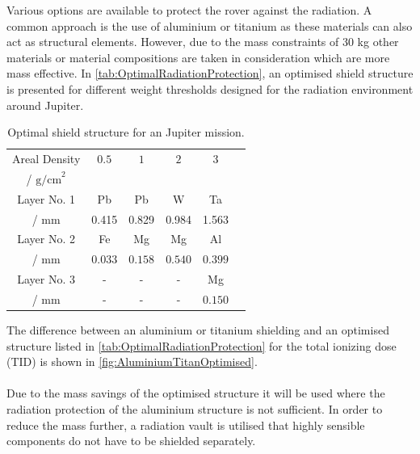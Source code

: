 Various options are available to protect the rover against the radiation. A common approach is the use of aluminium or titanium as these materials can also act as structural elements. However, due to the mass constraints of 30 kg other materials or material compositions are taken in consideration which are more mass effective. In \autoref{tab:OptimalRadiationProtection}, an optimised shield structure is presented for different weight thresholds designed for the radiation environment around Jupiter.

\begin{table}
\centering
\caption{Optimal shield structure for an Jupiter mission. \cite{Platzhalter}}
\begin{adjustbox}{max width=\textwidth}
\begin{tabular}[l]{cccccc}

	\toprule
	
	Areal Density	&	\(0.5\)	&	\(1\) &  \(2\) & \(3\)	\\
	/ \(\text{g/cm}^2\)	&	&	&  & \\
	
	\midrule
	
	
	Layer No. 1	&	Pb &  Pb & W	& Ta	\\
	/ mm	&	0.415 &  0.829 & 0.984	& 1.563	\\
	
	
	Layer No. 2	&	Fe	&  Mg &	Mg & Al \\
	/ mm	&	\(0.033\)	&  \(0.158\) &	\(0.540\) & \(0.399\) \\
	
	
	Layer No. 3 &	-	&  -	& - & Mg \\
	/ mm &	-	&  -	& - & \(0.150\) \\
	

	\bottomrule

\end{tabular}
\end{adjustbox}
\label{tab:OptimalRadiationProtection}
\end{table}

The difference between an aluminium or titanium shielding and an optimised structure listed in \autoref{tab:OptimalRadiationProtection} for the total ionizing dose (TID) is shown in \autoref{fig:AluminiumTitanOptimised}. \\ \\
Due to the mass savings of the optimised structure it will be used where the radiation protection of the aluminium structure is not sufficient. In order to reduce the mass further, a radiation vault is utilised that highly sensible components do not have to be shielded separately.

